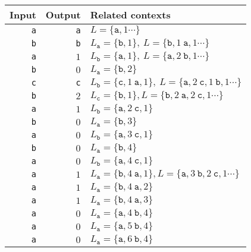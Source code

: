   \begin{tabular}{rrl}
    Input & Output & Related contexts\\
    \hline
    {\tt a} & {\tt a} & $L=\{\mathtt{a},1\cdots\}$\\
    {\tt b} & {\tt b} & $L_{\mathtt{a}}=\{\mathtt{b},1\},~L=\{\mathtt{b},1~\mathtt{a},1\cdots\}$\\
    {\tt a} &     $1$ & $L_{\mathtt{b}}=\{\mathtt{a},1\},~L=\{\mathtt{a},2~\mathtt{b},1\cdots\}$\\
    {\tt b} &     $0$ & $L_{\mathtt{a}}=\{\mathtt{b},2\}$\\
    {\tt c} & {\tt c} & $L_{\mathtt{b}}=\{\mathtt{c},1~\mathtt{a},1\},~L=\{\mathtt{a},2~\mathtt{c},1~\mathtt{b},1\cdots\}$\\
    {\tt b} &     $2$ & $L_{\mathtt{c}}=\{\mathtt{b},1\}, L=\{\mathtt{b},2~\mathtt{a},2~\mathtt{c},1\cdots\}$\\ 
    {\tt a} &     $1$ & $L_{\mathtt{b}}=\{\mathtt{a},2~\mathtt{c},1\}$\\
    {\tt b} &     $0$ & $L_{\mathtt{a}}=\{\mathtt{b},3\}$\\
    {\tt a} &     $0$ & $L_{\mathtt{b}}=\{\mathtt{a},3~\mathtt{c},1\}$\\
    {\tt b} &     $0$ & $L_{\mathtt{a}}=\{\mathtt{b},4\}$\\
    {\tt a} &     $0$ & $L_{\mathtt{b}}=\{\mathtt{a},4~\mathtt{c},1\}$\\
    {\tt a} &     $1$ & $L_{\mathtt{a}}=\{\mathtt{b},4~\mathtt{a},1\}, L=\{\mathtt{a},3~\mathtt{b},2~\mathtt{c},1\cdots\}$\\
    {\tt a} &     $1$ & $L_{\mathtt{a}}=\{\mathtt{b},4~\mathtt{a},2\}$\\
    {\tt a} &     $1$ & $L_{\mathtt{a}}=\{\mathtt{b},4~\mathtt{a},3\}$\\
    {\tt a} &     $0$ & $L_{\mathtt{a}}=\{\mathtt{a},4~\mathtt{b},4\}$\\
    {\tt a} &     $0$ & $L_{\mathtt{a}}=\{\mathtt{a},5~\mathtt{b},4\}$\\
    {\tt a} &     $0$ & $L_{\mathtt{a}}=\{\mathtt{a},6~\mathtt{b},4\}$
  \end{tabular}

